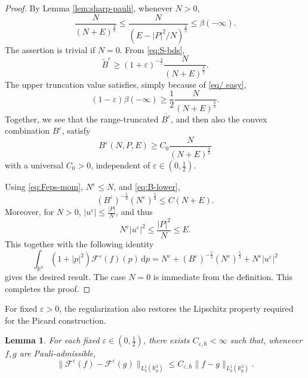\documentclass[10pt,reqno]{amsart}
\numberwithin{equation}{section}
\newtheorem{lemma}{Lemma}[section]
\theoremstyle{definition}
\newcommand{\R}{\mathbb R}
\newcommand{\dpp}{\mathrm{d}p}
\newcommand{\be}{B^{\varepsilon}}
\newcommand{\e}{\varepsilon}
\newcommand{\calF}{\mathcal F}
\newcommand{\bq}{\begin{equation}}
\newcommand{\eq}{\end{equation}}
\begin{document}
\begin{proof}
By Lemma \ref{lem:sharp-pauli}, whenever $N>0$,
\begin{equation}\label{eq/ easy}
 \frac{N}{(N+E)^{\frac35}}  \leq \frac{N}{(E-|P|^2/N)^{\frac35}}  \leq\beta(-\infty).
\end{equation}
The assertion is trivial if $N=0$.  From \eqref{eq:S-bds},
\[%
 \widetilde B^\e  \geq(1+\e)^{-\frac35}\frac{N}{(N+E)^{\frac35}}.
\]%
The upper truncation value satisfies, simply because of \eqref{eq/ easy},
\[
 (1-\e)\beta(-\infty) \geq\frac12\frac{N}{(N+E)^{\frac35}}.
\]
Together, we see that the range-truncated $\overline{B^\e}$, and then also the convex combination $\be$, satisfy
\bq \label{eq:B-lower}
 \be(N,P,E)  \geq C_0\frac{N}{(N+E)^{\frac35}}
\eq
with a universal $C_0>0$, independent of $\e\in(0,\frac12)$.

Using \eqref{eq:Feps-mom}, $N^\e\leq N$, and \eqref{eq:B-lower},
\[
 (\be)^{-\frac53}(N^\e)^{\frac53}  \leq C(N+E).
\]
Moreover, for $N>0$, $|u^\e|\leq\frac{|P|}{N}$, and thus
\begin{equation}\label{eq:E-lower}
 N^\e|u^\e|^2 \leq\frac{|P|^2}{N}\leq E.
\end{equation}
This together with the following identity
\[
 \int_{\R^3}(1+|p|^2)\calF^\e(f)(p)\,\dpp = N^\e + (\be)^{-\frac53}(N^\e)^{\frac53} +  N^\e|u^\e|^2
\]
gives the desired result.  The case $N=0$ is immediate from the definition. This completes the proof.
\end{proof}

For fixed $\e>0$, the regularization also restores the Lipschitz property required for the Picard construction.


\begin{lemma}\label{lem:fix-e-Lip}
For each fixed $\e\in(0,\frac12)$, there exists $C_{\e,\hbar}<\infty$ such that, whenever $f,g$ are Pauli-admissible,
\[
 \|\calF^\e(f)-\calF^\e(g)\|_{L^1_2(\R^3_p)} \leq C_{\e,\hbar}\|f-g\|_{L^1_2(\R^3_p)}.
\]
\end{lemma}
\end{document}

